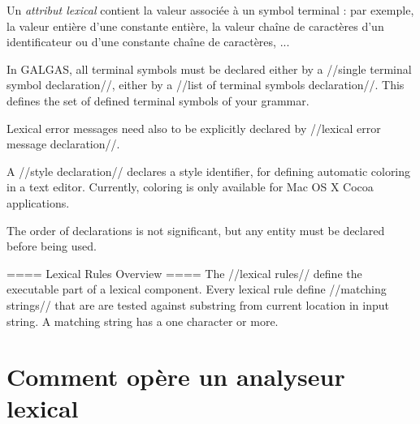 Un \emph{attribut lexical} contient la valeur associée à un symbol terminal : par exemple, la valeur entière d'une constante entière, la valeur chaîne de caractères d'un identificateur ou d'une constante chaîne de caractères, ...


In GALGAS, all terminal symbols must be declared either by a //single terminal symbol declaration//, either by a //list of terminal symbols declaration//. This defines the set of defined terminal symbols of your grammar.

Lexical error messages need also to be explicitly declared by //lexical error message declaration//.

A //style declaration// declares a style identifier, for defining automatic coloring in a text editor. Currently, coloring is only available for Mac OS X Cocoa applications.

The order of declarations is not significant, but any entity must be declared before being used.

==== Lexical Rules Overview ====
The //lexical rules// define the executable part of a lexical component. Every lexical rule define //matching strings// that are are tested against substring from current location in input string. A matching string has a one character or more.

%
%


\section{Comment opère un analyseur lexical}

